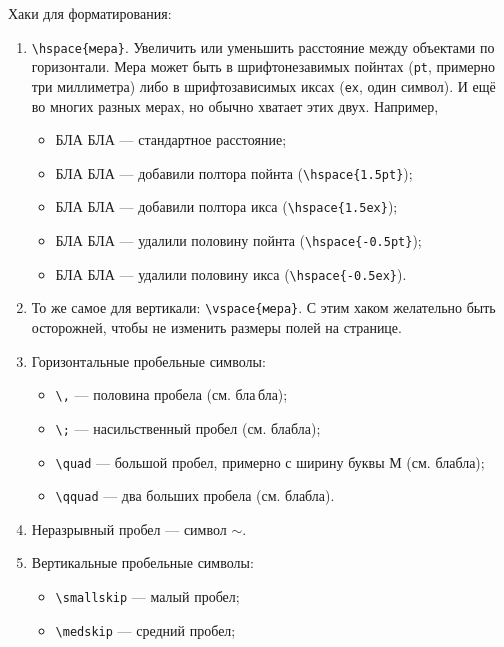 \documentclass[14pt,russian]{scrartcl}
\begin{document}
Хаки для форматирования:
\begin{enumerate}
\item \texttt{\textbackslash hspace\{мера\}}. Увеличить или уменьшить расстояние между объектами по горизонтали. Мера может быть в шрифтонезавимых пойнтах (\texttt{pt}, примерно три миллиметра) либо в шрифтозависимых иксах (\texttt{ex}, один символ). И ещё во многих разных мерах, но обычно хватает этих двух. Например, 
\begin{itemize}
\item БЛА БЛА --- стандартное расстояние; 
\item БЛА\hspace{1.5pt} БЛА --- добавили полтора пойнта (\texttt{\textbackslash hspace\{1.5pt\}});
\item БЛА\hspace{1.5ex} БЛА --- добавили полтора икса (\texttt{\textbackslash hspace\{1.5ex\}});
\item БЛА\hspace{-0.5pt} БЛА --- удалили половину пойнта (\texttt{\textbackslash hspace\{-0.5pt\}});
\item БЛА\hspace{-0.5ex} БЛА --- удалили половину икса (\texttt{\textbackslash hspace\{-0.5ex\}}).
\end{itemize}
\item То же самое для вертикали: \texttt{\textbackslash vspace\{мера\}}. С этим хаком желательно быть осторожней, чтобы не изменить размеры полей на странице.
\item Горизонтальные пробельные символы:
\begin{itemize}
\item \texttt{\textbackslash ,} --- половина пробела (см. бла\,бла);
\item \texttt{\textbackslash ;} --- насильственный пробел (см. бла\;бла);
\item \texttt{\textbackslash quad} --- большой пробел, примерно с ширину буквы М (см. бла\quad бла);
\item \texttt{\textbackslash qquad} --- два больших пробела  (см. бла\qquad бла).
\end{itemize}
\item Неразрывный пробел --- символ $\sim$.
\item Вертикальные пробельные символы:
\begin{itemize}
\item \texttt{\textbackslash smallskip} --- малый пробел;
\item \texttt{\textbackslash medskip} --- средний пробел;

\end{itemize}
\end{enumerate}
\end{document}
